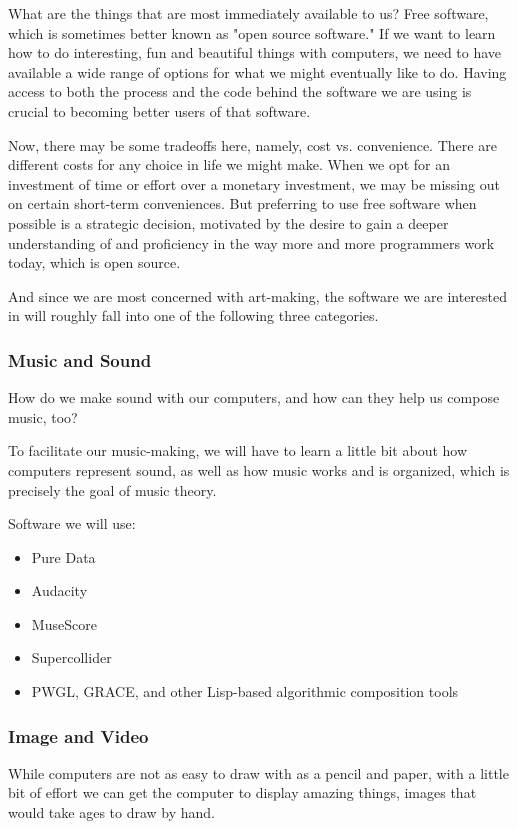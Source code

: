 \documentclass[11pt]{article}
\begin{document}
What are the things that are most immediately available to us? Free
software, which is sometimes better known as "open source software."
If we want to learn how to do interesting, fun and beautiful things
with computers, we need to have available a wide range of options for
what we might eventually like to do. Having access to both the process
and the code behind the software we are using is crucial to becoming
better users of that software.

Now, there may be some tradeoffs here, namely, cost vs. convenience.
There are different costs for any choice in life we might make. When
we opt for an investment of time or effort over a monetary investment,
we may be missing out on certain short-term conveniences. But
preferring to use free software when possible is a strategic decision,
motivated by the desire to gain a deeper understanding of and
proficiency in the way more and more programmers work today, which is
open source.

And since we are most concerned with art-making, the software we are
interested in will roughly fall into one of the following three categories.
\subsubsection{Music and Sound}
\label{sec:orgheadline5}
How do we make sound with our computers, and how can they help us
compose music, too?

To facilitate our music-making, we will have to learn a little bit about
how computers represent sound, as well as how music works and is
organized, which is precisely the goal of music theory.

Software we will use:

\begin{itemize}
\item Pure Data
\item Audacity
\item MuseScore
\item Supercollider
\item PWGL, GRACE, and other Lisp-based algorithmic composition tools
\end{itemize}

\subsubsection{Image and Video}
\label{sec:orgheadline6}
While computers are not as easy to draw with as a pencil and paper, with a little bit of effort we can get the computer to display amazing things, images that would take ages to draw by hand.
\end{document}
